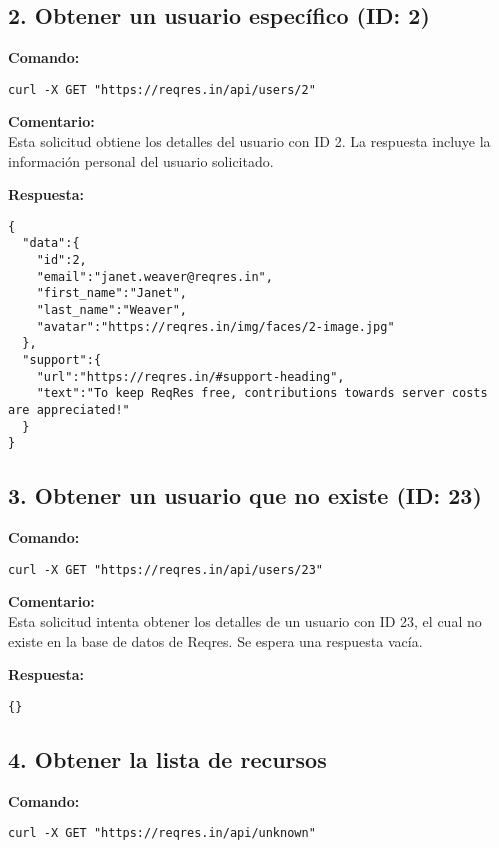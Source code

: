 \documentclass[12pt,a4paper]{article}
\begin{document}
\subsection{2. Obtener un usuario específico (ID: 2)}
\textbf{Comando:}
\begin{samepage}
\begin{verbatim}
curl -X GET "https://reqres.in/api/users/2"
\end{verbatim}
\end{samepage}

\textbf{Comentario:}\\
Esta solicitud obtiene los detalles del usuario con ID 2. La respuesta incluye la información personal del usuario solicitado.

\textbf{Respuesta:}
\begin{samepage}
\begin{verbatim}
{
  "data":{
    "id":2,
    "email":"janet.weaver@reqres.in",
    "first_name":"Janet",
    "last_name":"Weaver",
    "avatar":"https://reqres.in/img/faces/2-image.jpg"
  },
  "support":{
    "url":"https://reqres.in/#support-heading",
    "text":"To keep ReqRes free, contributions towards server costs are appreciated!"
  }
}
\end{verbatim}
\end{samepage}

\subsection{3. Obtener un usuario que no existe (ID: 23)}
\textbf{Comando:}
\begin{samepage}
\begin{verbatim}
curl -X GET "https://reqres.in/api/users/23"
\end{verbatim}
\end{samepage}

\textbf{Comentario:}\\
Esta solicitud intenta obtener los detalles de un usuario con ID 23, el cual no existe en la base de datos de Reqres. Se espera una respuesta vacía.

\textbf{Respuesta:}
\begin{samepage}
\begin{verbatim}
{}
\end{verbatim}
\end{samepage}

\subsection{4. Obtener la lista de recursos}
\textbf{Comando:}
\begin{samepage}
\begin{verbatim}
curl -X GET "https://reqres.in/api/unknown"
\end{verbatim}
\end{samepage}
\end{document}
